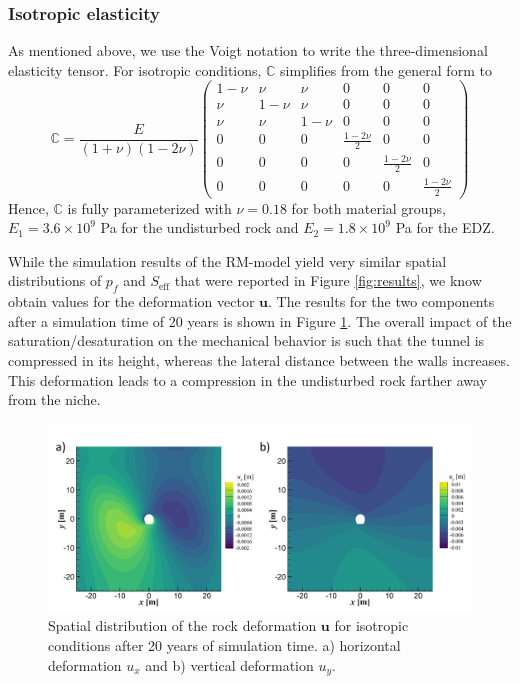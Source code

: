\subsubsection*{Isotropic elasticity}
As mentioned above, we use the Voigt notation to write the three-dimensional elasticity tensor. For isotropic conditions, $\mathds{C}$ simplifies from the general form to
\begin{equation}
\mathds{C} =  \frac{E}{(1+\nu)(1-2\nu)}	
				\begin{pmatrix}
				1-\nu 	& \nu	& \nu	& 0				   &0					&0 	\\
				\nu	  	& 1-\nu	& \nu	& 0				   &0					&0	\\
				\nu		& \nu	& 1-\nu	& 0				   &0					&0	\\		
				0		& 0		& 0		& \frac{1-2\nu}{2} &0					&0	\\		
				0		& 0		& 0		&0				   &\frac{1-2\nu}{2}	&0	\\		
				0		& 0		& 0		&0				   &0      &\frac{1-2\nu}{2}
				\end {pmatrix}
\end{equation}
Hence, $\mathds{C}$ is fully parameterized with $\nu=0.18$ for both material groups, $E_1=3.6 \times 10^9$ Pa for the undisturbed rock and $E_2=1.8\times 10^9 $ Pa for the EDZ.


While the simulation results of the RM-model yield very similar spatial distributions of $p_f$ and $S_\text{eff}$ that were reported in Figure \ref{fig:results}, we know obtain values for the deformation vector $\textbf{u}$. The results for the two components after a simulation time of 20 years is shown in Figure \ref{fig:RM_displacement_isotropic}. The overall impact of the saturation/desaturation on the mechanical behavior is such that the tunnel is compressed in its height, whereas the lateral distance between the walls increases. This deformation leads to a compression in the undisturbed rock farther away from the niche.  

\begin{figure}[t]
\includegraphics[width=\textwidth, trim=0.5cm  0.0cm 0 0.0cm, clip]{./figures/MEX10_RM_OGS5_isotropic.png}
\caption{Spatial distribution of the rock deformation $\textbf{u}$  for isotropic conditions after 20 years of simulation time. a) horizontal deformation $u_x$ and b) vertical deformation $u_y$.}
\label{fig:RM_displacement_isotropic}
\end{figure}

